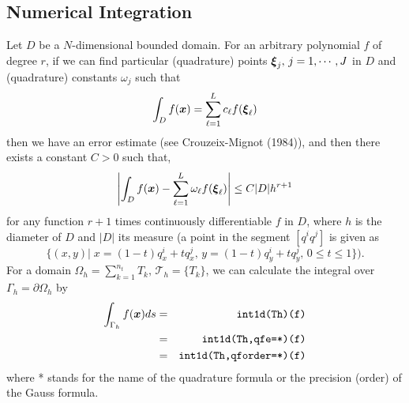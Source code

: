 \documentclass[a4paper,twoside,12pt]{book}
\def\vec#1{\mbox{\boldmath $#1$}}
\def\p{\partial}
\def\setS#1{#1\label{sec:#1}}
\begin{document}
\subsection{\setS{Numerical Integration}}
Let $D$ be a $N$-dimensional bounded domain.
For an arbitrary polynomial $f$ of degree $r$,
if we can find particular (quadrature) points $\vec{\xi}_j,\, j=1,\cdots,J$ in $D$ and
(quadrature) constants $\omega_j$ such that
\begin{eqnarray}
\label{eqn:GaussInt}
\int_{D}f(\vec{x}) = \sum_{\ell =1}^L c_\ell f(\vec{\xi}_\ell)
\end{eqnarray}
then we have an error estimate (see Crouzeix-Mignot (1984)),
and then there exists a constant $C>0$ such that,
\begin{eqnarray}
\label{eqn:GaussIntError}
\left|\int_{D}f(\vec{x}) - \sum_{\ell =1}^L \omega_\ell
f(\vec{\xi}_\ell )\right|
\le C|D|h^{r+1}
\end{eqnarray}
for any function $r + 1$ times continuously differentiable $f$ in $D$,
where $h$ is the diameter of $D$ and $|D|$ its measure (a point in the segment $[q^iq^j]$ is given as
\[
\{(x,y)|\; x=(1-t)q^i_x+tq^j_x,\, y=(1-t)q^i_y+tq^j_y,\, 0\le t\le 1\}
).
\]
For a domain $\Omega_h=\sum_{k=1}^{n_t}T_k,\, \mathcal{T}_h=\{T_k\}$,
we can calculate the integral over $\Gamma_h=\p\Omega_h$ by
\begin{eqnarray*}
\int_{\Gamma_h}f(\vec{x})ds&=&\texttt{int1d(Th)(f)}\\
&=&\texttt{int1d(Th,qfe=*)(f)}\\
&=&\texttt{int1d(Th,qforder=*)(f)}
\end{eqnarray*}
where * stands for the name of the quadrature formula or the precision (order) of the Gauss formula.
\end{document}
